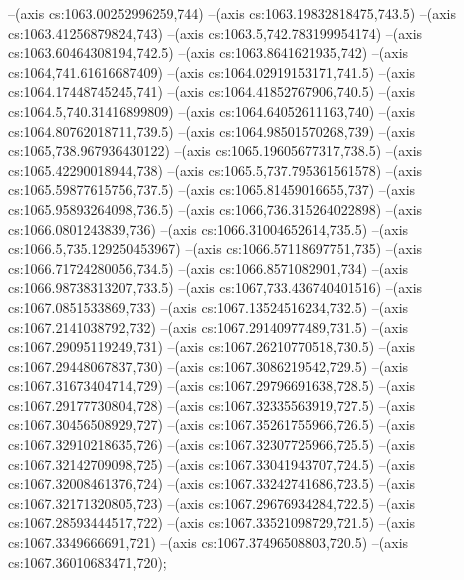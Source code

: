 --(axis cs:1063.00252996259,744)
--(axis cs:1063.19832818475,743.5)
--(axis cs:1063.41256879824,743)
--(axis cs:1063.5,742.783199954174)
--(axis cs:1063.60464308194,742.5)
--(axis cs:1063.8641621935,742)
--(axis cs:1064,741.61616687409)
--(axis cs:1064.02919153171,741.5)
--(axis cs:1064.17448745245,741)
--(axis cs:1064.41852767906,740.5)
--(axis cs:1064.5,740.31416899809)
--(axis cs:1064.64052611163,740)
--(axis cs:1064.80762018711,739.5)
--(axis cs:1064.98501570268,739)
--(axis cs:1065,738.967936430122)
--(axis cs:1065.19605677317,738.5)
--(axis cs:1065.42290018944,738)
--(axis cs:1065.5,737.795361561578)
--(axis cs:1065.59877615756,737.5)
--(axis cs:1065.81459016655,737)
--(axis cs:1065.95893264098,736.5)
--(axis cs:1066,736.315264022898)
--(axis cs:1066.0801243839,736)
--(axis cs:1066.31004652614,735.5)
--(axis cs:1066.5,735.129250453967)
--(axis cs:1066.57118697751,735)
--(axis cs:1066.71724280056,734.5)
--(axis cs:1066.8571082901,734)
--(axis cs:1066.98738313207,733.5)
--(axis cs:1067,733.436740401516)
--(axis cs:1067.0851533869,733)
--(axis cs:1067.13524516234,732.5)
--(axis cs:1067.2141038792,732)
--(axis cs:1067.29140977489,731.5)
--(axis cs:1067.29095119249,731)
--(axis cs:1067.26210770518,730.5)
--(axis cs:1067.29448067837,730)
--(axis cs:1067.3086219542,729.5)
--(axis cs:1067.31673404714,729)
--(axis cs:1067.29796691638,728.5)
--(axis cs:1067.29177730804,728)
--(axis cs:1067.32335563919,727.5)
--(axis cs:1067.30456508929,727)
--(axis cs:1067.35261755966,726.5)
--(axis cs:1067.32910218635,726)
--(axis cs:1067.32307725966,725.5)
--(axis cs:1067.32142709098,725)
--(axis cs:1067.33041943707,724.5)
--(axis cs:1067.32008461376,724)
--(axis cs:1067.33242741686,723.5)
--(axis cs:1067.32171320805,723)
--(axis cs:1067.29676934284,722.5)
--(axis cs:1067.28593444517,722)
--(axis cs:1067.33521098729,721.5)
--(axis cs:1067.3349666691,721)
--(axis cs:1067.37496508803,720.5)
--(axis cs:1067.36010683471,720);

